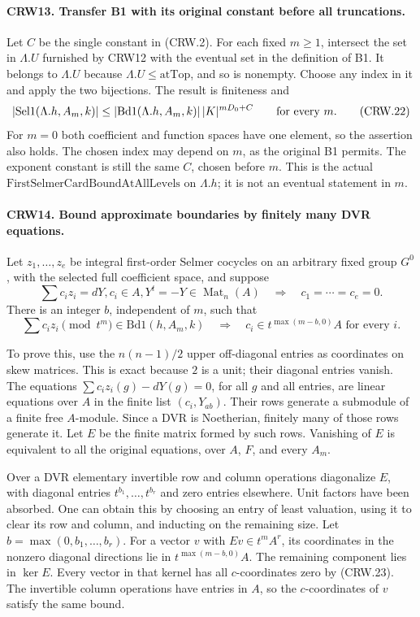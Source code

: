 \paragraph{CRW13. Transfer B1 with its original constant before all truncations.}
\label{claim:CRW13}
Let $C$ be the single constant in (CRW.2).
For each fixed $m\ge1$, intersect the set in
$\Lambda.U$ furnished by CRW12 with the eventual set
in the definition of B1.  It belongs to $\Lambda.U$
because $\Lambda.U\le\mathrm{atTop}$, and so is nonempty.
Choose any index in it and apply the two bijections.
The result is finiteness and
\[
 |\mathrm{Sel1}(\Lambda.h,A_m,k)|
 \leq |\mathrm{Bd1}(\Lambda.h,A_m,k)|\,
       |K|^{mD_0+C}\qquad\hbox{for every }m.         \tag{CRW.22}
\]
For $m=0$ both coefficient and function spaces have one
element, so the assertion also holds.
The chosen index may depend on $m$, as the original B1
permits.  The exponent constant is still the same $C$,
chosen before $m$.  This is the actual
$\mathrm{FirstSelmerCardBoundAtAllLevels}$ on
$\Lambda.h$; it is not an eventual statement in $m$.

\paragraph{CRW14. Bound approximate boundaries by finitely many DVR equations.}
\label{claim:CRW14}
Let $z_1,\ldots,z_e$ be integral first-order Selmer
cocycles on an arbitrary fixed group $G^0$, with the
selected full coefficient space, and suppose
\[
 \sum c_i z_i=dY, c_i\in A, Y^t=-Y\in\operatorname{Mat}_n(A)
       \quad\Longrightarrow\quad c_1=\cdots=c_e=0.\tag{CRW.23}
\]
There is an integer $b$, independent of $m$, such that
\[
 \sum c_i z_i\pmod {t^m}\in\mathrm{Bd1}(h,A_m,k)
       \quad\Longrightarrow\quad
       c_i\in t^{\max(m-b,0)}A\text{ for every }i.  \tag{CRW.24}
\]

To prove this, use the $n(n-1)/2$ upper off-diagonal
entries as coordinates on skew matrices.  This is exact
because $2$ is a unit; their diagonal entries vanish.
The equations
$\sum c_i z_i(g)-dY(g)=0$, for all $g$ and all entries,
are linear equations over $A$ in the finite list
$(c_i,Y_{ab})$.  Their rows generate a submodule of a
finite free $A$-module.  Since a DVR is Noetherian,
finitely many of those rows generate it.  Let $E$ be
the finite matrix formed by such rows.
Vanishing of $E$ is equivalent to all the original
equations, over $A$, $F$, and every $A_m$.

Over a DVR elementary invertible row and column
operations diagonalize $E$, with diagonal entries
$t^{b_1},\ldots,t^{b_r}$ and zero entries elsewhere.
Unit factors have been absorbed.  One can obtain this by
choosing an entry of least valuation, using it to
clear its row and column, and inducting on the
remaining size.  Let $b=\max(0,b_1,\ldots,b_r)$.
For a vector $v$ with $Ev\in t^mA^r$, its coordinates
in the nonzero diagonal directions lie in
$t^{\max(m-b,0)}A$.  The remaining component lies in
$\ker E$.  Every vector in that kernel has all
$c$-coordinates zero by (CRW.23).
The invertible column operations have entries in $A$,
so the $c$-coordinates of $v$ satisfy the same bound.

